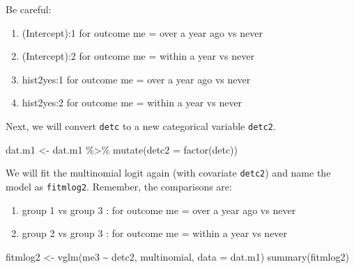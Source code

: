 \documentclass[
  10pt,
]{krantz}
\newenvironment{Shaded}{\begin{snugshade}}{\end{snugshade}}
\newcommand{\AttributeTok}[1]{\textcolor[rgb]{0.77,0.63,0.00}{#1}}
\newcommand{\FunctionTok}[1]{\textcolor[rgb]{0.00,0.00,0.00}{#1}}
\newcommand{\NormalTok}[1]{#1}
\newcommand{\OtherTok}[1]{\textcolor[rgb]{0.56,0.35,0.01}{#1}}
\newcommand{\SpecialCharTok}[1]{\textcolor[rgb]{0.00,0.00,0.00}{#1}}
\providecommand{\tightlist}{%
  \setlength{\itemsep}{0pt}\setlength{\parskip}{0pt}}
\begin{document}
Be careful:

\begin{enumerate}
\def\labelenumi{\arabic{enumi}.}
\tightlist
\item
  (Intercept):1 for outcome me = over a year ago vs never
\item
  (Intercept):2 for outcome me = within a year vs never
\item
  hist2yes:1 for outcome me = over a year ago vs never
\item
  hist2yes:2 for outcome me = within a year vs never
\end{enumerate}

Next, we will convert \texttt{detc} to a new categorical variable \texttt{detc2}.

\begin{Shaded}
\begin{Highlighting}[]
\NormalTok{dat.m1 }\OtherTok{\textless{}{-}} 
\NormalTok{  dat.m1 }\SpecialCharTok{\%\textgreater{}\%} 
  \FunctionTok{mutate}\NormalTok{(}\AttributeTok{detc2 =} \FunctionTok{factor}\NormalTok{(detc))}
\end{Highlighting}
\end{Shaded}

We will fit the multinomial logit again (with covariate \texttt{detc2}) and name the model as \texttt{fitmlog2}. Remember, the comparisons are:

\begin{enumerate}
\def\labelenumi{\arabic{enumi}.}
\tightlist
\item
  group 1 vs group 3 : for outcome me = over a year ago vs never
\item
  group 2 vs group 3 : for outcome me = within a year vs never
\end{enumerate}

\begin{Shaded}
\begin{Highlighting}[]
\NormalTok{fitmlog2 }\OtherTok{\textless{}{-}} \FunctionTok{vglm}\NormalTok{(me3 }\SpecialCharTok{\textasciitilde{}}\NormalTok{ detc2, multinomial, }\AttributeTok{data =}\NormalTok{ dat.m1)}
\FunctionTok{summary}\NormalTok{(fitmlog2)}
\end{Highlighting}
\end{Shaded}
\end{document}
